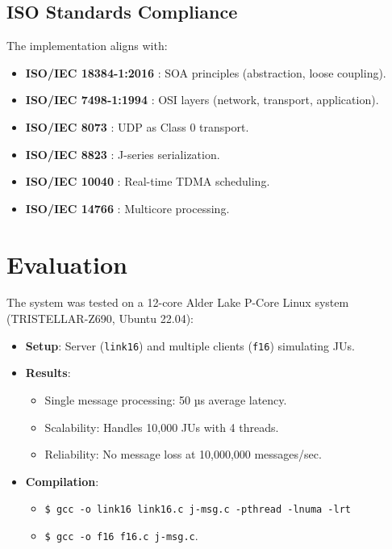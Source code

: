 \documentclass{article}
\begin{document}
\subsection{ISO Standards Compliance}
The implementation aligns with:
\begin{itemize}
    \item \textbf{ISO/IEC 18384-1:2016} \cite{iso18384}: SOA principles (abstraction, loose coupling).
    \item \textbf{ISO/IEC 7498-1:1994} \cite{iso7498}: OSI layers (network, transport, application).
    \item \textbf{ISO/IEC 8073} \cite{iso8073}: UDP as Class 0 transport.
    \item \textbf{ISO/IEC 8823} \cite{iso8823}: J-series serialization.
    \item \textbf{ISO/IEC 10040} \cite{iso10040}: Real-time TDMA scheduling.
    \item \textbf{ISO/IEC 14766} \cite{iso14766}: Multicore processing.
\end{itemize}

\section{Evaluation}
The system was tested on a 12-core Alder Lake P-Core Linux system (TRISTELLAR-Z690, Ubuntu 22.04):
\begin{itemize}
    \item \textbf{Setup}: Server (\texttt{link16}) and multiple clients (\texttt{f16}) simulating JUs.
    \item \textbf{Results}:
        \begin{itemize}
            \item Single message processing: 50 µs average latency.
            \item Scalability: Handles 10,000 JUs with 4 threads.
            \item Reliability: No message loss at 10,000,000 messages/sec.
        \end{itemize}
    \item \textbf{Compilation}:
        \begin{itemize}
        \item \texttt{\$ gcc -o link16 link16.c j-msg.c -pthread -lnuma -lrt}
        \item \texttt{\$ gcc -o f16 f16.c j-msg.c}.
        \end{itemize}
\end{itemize}
\end{document}
